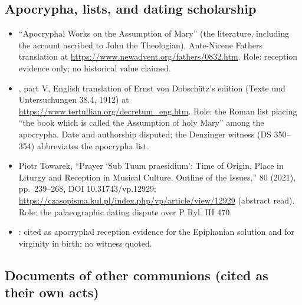\subsection*{Apocrypha, lists, and dating scholarship}

\begin{itemize}
\item ``Apocryphal Works on the Assumption of Mary'' (the
 literature, including the account ascribed to John the
Theologian), Ante-Nicene Fathers translation at
\url{https://www.newadvent.org/fathers/0832.htm}. Role: reception
evidence only; no historical value claimed.
\item {}, part V, English translation of Ernst von Dobsch\"utz's
edition (Texte und Untersuchungen 38.4, 1912) at
\url{https://www.tertullian.org/decretum_eng.htm}. Role: the Roman list
placing ``the book which is called the Assumption of holy Mary'' among
the apocrypha. Date and authorship disputed; the Denzinger witness (DS
350--354) abbreviates the apocrypha list.
\item Piotr Towarek, ``Prayer `Sub Tuum praesidium': Time of Origin,
Place in Liturgy and Reception in Musical Culture. Outline of the
Issues,''  80 (2021), pp.~239--268, DOI
10.31743/vp.12929:
\url{https://czasopisma.kul.pl/index.php/vp/article/view/12929}
(abstract read). Role: the palaeographic dating dispute over P.\,Ryl. III
470.
\item {}: cited as apocryphal reception
evidence for the Epiphanian solution and for virginity in birth; no
witness quoted.
\end{itemize}

\subsection*{Documents of other communions (cited as their own acts)}

